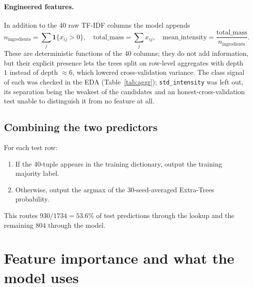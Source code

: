 \documentclass[11pt,a4paper]{article}
\begin{document}
\paragraph{Engineered features.} In addition to the $40$ raw TF-IDF columns the model
appends
\[
n_{\mathrm{ingredients}} = \sum_j \mathbf{1}\{x_{ij}>0\}, \quad
\mathrm{total\_mass} = \sum_j x_{ij}, \quad
\mathrm{mean\_intensity} = \frac{\mathrm{total\_mass}}{n_{\mathrm{ingredients}}}.
\]
These are deterministic functions of the $40$ columns; they do not add information, but
their explicit presence lets the trees split on row-level aggregates with depth $1$
instead of depth $\approx 6$, which lowered cross-validation variance. The class signal
of each was checked in the EDA (Table~\ref{tab:aggr}); \texttt{std\_intensity} was left
out, its separation being the weakest of the candidates and an honest-cross-validation
test unable to distinguish it from no feature at all.

\subsection{Combining the two predictors}

For each test row:
\begin{enumerate}
  \item If the $40$-tuple appears in the training dictionary, output the training majority
        label.
  \item Otherwise, output the argmax of the $30$-seed-averaged Extra-Trees probability.
\end{enumerate}
This routes $930/1734=53.6\%$ of test predictions through the lookup and the remaining
$804$ through the model.

\section{Feature importance and what the model uses}
\end{document}
